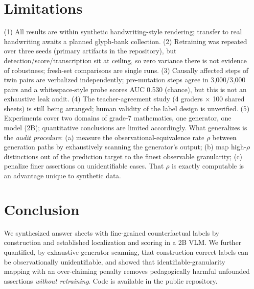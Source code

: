 \documentclass[11pt]{article}
\begin{document}
\section{Limitations}
(1) All results are within synthetic handwriting-style rendering; transfer to real handwriting awaits a planned glyph-bank collection. (2) Retraining was repeated over three seeds (primary artifacts in the repository), but detection/score/transcription sit at ceiling, so zero variance there is not evidence of robustness; fresh-set comparisons are single runs. (3) Causally affected steps of twin pairs are verbalized independently; pre-mutation steps agree in 3{,}000/3{,}000 pairs and a whitespace-style probe scores AUC 0.530 (chance), but this is not an exhaustive leak audit. (4) The teacher-agreement study (4 graders $\times$ 100 shared sheets) is still being arranged; human validity of the label design is unverified. (5) Experiments cover two domains of grade-7 mathematics, one generator, one model (2B); quantitative conclusions are limited accordingly. What generalizes is the \emph{audit procedure}: (a) measure the observational-equivalence rate $\rho$ between generation paths by exhaustively scanning the generator's output; (b) map high-$\rho$ distinctions out of the prediction target to the finest observable granularity; (c) penalize finer assertions on unidentifiable cases. That $\rho$ is exactly computable is an advantage unique to synthetic data.

\section{Conclusion}
We synthesized answer sheets with fine-grained counterfactual labels by construction and established localization and scoring in a 2B VLM. We further quantified, by exhaustive generator scanning, that construction-correct labels can be observationally unidentifiable, and showed that identifiable-granularity mapping with an over-claiming penalty removes pedagogically harmful unfounded assertions \emph{without retraining}. Code is available in the public repository.
\end{document}

